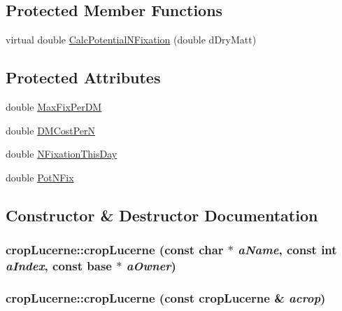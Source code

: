 \subsection*{Protected Member Functions}
\begin{DoxyCompactItemize}
\item 
virtual double \hyperlink{classcrop_lucerne_a1b79ced150076c79417cf1c1758bf1c4}{CalcPotentialNFixation} (double dDryMatt)
\end{DoxyCompactItemize}
\subsection*{Protected Attributes}
\begin{DoxyCompactItemize}
\item 
double \hyperlink{classcrop_lucerne_a1825e7ae2c0a02fa019d85c9df1e994c}{MaxFixPerDM}
\item 
double \hyperlink{classcrop_lucerne_a8b4d1f5dcb870fac95a5f4e1d1030617}{DMCostPerN}
\item 
double \hyperlink{classcrop_lucerne_a1ddd2bbb29f98dd4dcd30e7a947ea1ec}{NFixationThisDay}
\item 
double \hyperlink{classcrop_lucerne_a3e326582f4ff33cd22db66290510696c}{PotNFix}
\end{DoxyCompactItemize}


\subsection{Constructor \& Destructor Documentation}
\hypertarget{classcrop_lucerne_a18a128ff7c9bb7f4fefb9364e402bc34}{
\subsubsection[{cropLucerne}]{\setlength{\rightskip}{0pt plus 5cm}cropLucerne::cropLucerne (const char $\ast$ {\em aName}, \/  const int {\em aIndex}, \/  const {\bf base} $\ast$ {\em aOwner})}}
\label{classcrop_lucerne_a18a128ff7c9bb7f4fefb9364e402bc34}
\hypertarget{classcrop_lucerne_a755889d07d217abc7b5dc399640c84f1}{
\subsubsection[{cropLucerne}]{\setlength{\rightskip}{0pt plus 5cm}cropLucerne::cropLucerne (const {\bf cropLucerne} \& {\em acrop})}}
\label{classcrop_lucerne_a755889d07d217abc7b5dc399640c84f1}


